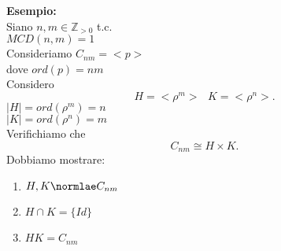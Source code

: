 \documentclass[12px]{article}
\begin{document}
{\begin{dimo}[2]
	  \end{dimo}
\textbf{Esempio:}\\
Siano $n,m\in\mathbb Z_{>0}$ t.c.\\
$MCD(n,m) = 1$\\
Consideriamo  $C_{nm} = <p>$\\
dove  $ord(p) = nm$\\
Considero
 \[
H = <\rho^m> \ \ \ K = <\rho^n>
.\] 
$|H| = ord(\rho^m) = n$\\
$|K| = ord(\rho^n) = m$\\
Verifichiamo che
 \[
	 C_{nm} \cong H\times K
.\] 
Dobbiamo mostrare:
\begin{enumerate}
	\item $H,K\normlae C_{nm}$\\
	\item $H\cap K = \{Id\}$\\
	\item $HK = C_{nm}$
	

\end{enumerate}}
\end{document}
